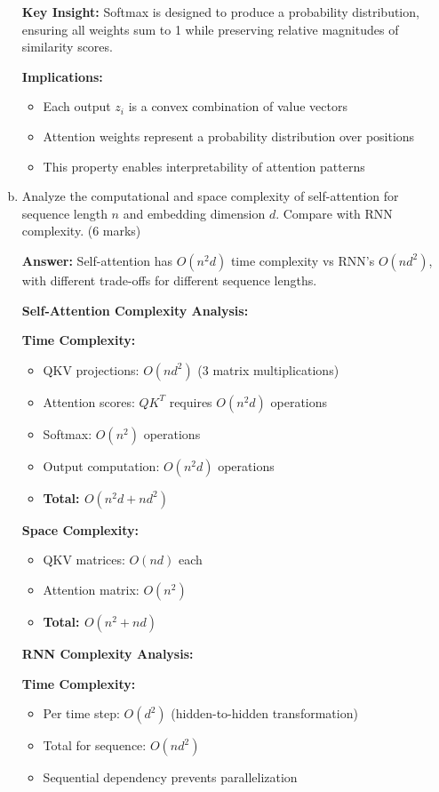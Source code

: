 \documentclass[12pt]{article}
\newcommand{\answer}[1]{{\color{answercolor}\textbf{Answer:} #1}}
\newcommand{\explanation}[1]{{\color{explanationcolor}#1}}
\begin{document}
\begin{center}
\begin{enumerate}[(a)]
{    \textbf{Key Insight:} Softmax is designed to produce a probability distribution, ensuring all weights sum to 1 while preserving relative magnitudes of similarity scores.
    
    \textbf{Implications:}
    \begin{itemize}
        \item Each output $z_i$ is a convex combination of value vectors
        \item Attention weights represent a probability distribution over positions
        \item This property enables interpretability of attention patterns
    \end{itemize}
    }
    
    \item Analyze the computational and space complexity of self-attention for sequence length $n$ and embedding dimension $d$. Compare with RNN complexity. \hfill (6 marks)
    
    \answer{Self-attention has $O(n^2d)$ time complexity vs RNN's $O(nd^2)$, with different trade-offs for different sequence lengths.}
    
    \explanation{
    \textbf{Self-Attention Complexity Analysis:}
    
    \textbf{Time Complexity:}
    \begin{itemize}
        \item QKV projections: $O(nd^2)$ (3 matrix multiplications)
        \item Attention scores: $QK^T$ requires $O(n^2d)$ operations
        \item Softmax: $O(n^2)$ operations
        \item Output computation: $O(n^2d)$ operations
        \item \textbf{Total: $O(n^2d + nd^2)$}
    \end{itemize}
    
    \textbf{Space Complexity:}
    \begin{itemize}
        \item QKV matrices: $O(nd)$ each
        \item Attention matrix: $O(n^2)$
        \item \textbf{Total: $O(n^2 + nd)$}
    \end{itemize}
    
    \textbf{RNN Complexity Analysis:}
    
    \textbf{Time Complexity:}
    \begin{itemize}
        \item Per time step: $O(d^2)$ (hidden-to-hidden transformation)
        \item Total for sequence: $O(nd^2)$
        \item Sequential dependency prevents parallelization
    \end{itemize}
    
}
\end{enumerate}
\end{center}
\end{document}
